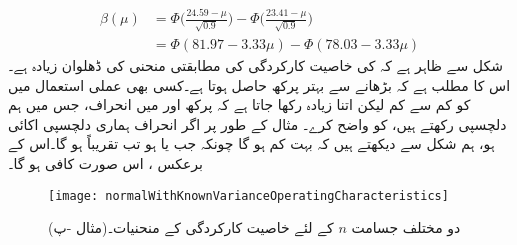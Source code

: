 \begin{align*}
\beta(\mu)&=\Phi\big(\frac{24.59-\mu}{\sqrt{0.9}}\big)-\Phi\big(\frac{23.41-\mu}{\sqrt{0.9}}\big)\\
&=\Phi(81.97-3.33\mu)-\Phi(78.03-3.33\mu)
\end{align*}
شکل  سے ظاہر ہے کہ  کی خاصیت کارکردگی کی مطابقتی منحنی کی ڈھلوان زیادہ ہے۔اس کا مطلب ہے کہ  بڑھانے سے بہتر پرکھ حاصل ہوتا ہے۔کسی بھی عملی استعمال میں  کو کم سے کم لیکن اتنا زیادہ رکھا جاتا ہے کہ پرکھ  اور  میں انحراف، جس میں ہم دلچسپی رکھتے ہیں، کو  واضح  کرے۔ مثال کے طور پر اگر انحراف ہماری دلچسپی   اکائی ہو، ہم شکل سے دیکھتے ہیں کہ  بہت کم ہو گا چونکہ جب  یا  ہو تب  تقریباً  ہو گا۔اس کے برعکس ،  اس صورت کافی ہو گا۔
\begin{figure}
\centering
\texttt{[image: normalWithKnownVarianceOperatingCharacteristics]}
\caption{دو مختلف جسامت $n$ کے لئے خاصیت کارکردگی کے منحنیات۔(مثال -پ)}
\label{شکل_مثال_شماریات_معلوم_تغیریت_عمومی_تقسیم_کی_اوسط_کارکردگی}
\end{figure}

